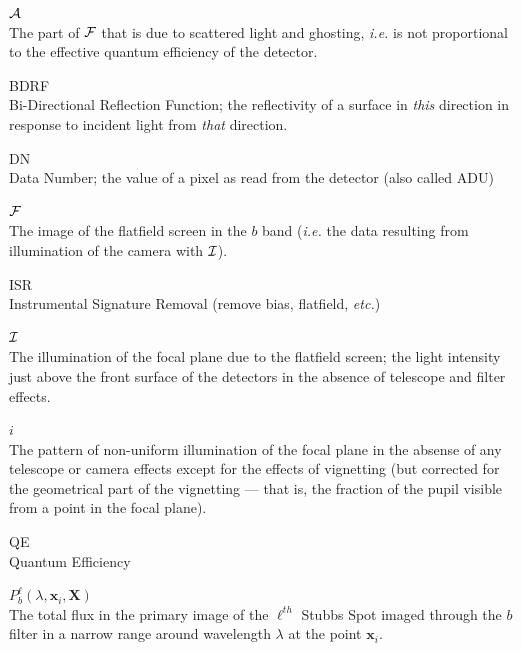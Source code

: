 \documentclass[12pt]{article}
\newcommand{\etc}{\textit{etc.}\xspace}
\newcommand{\ie}{\textit{i.e.}\xspace}
\newcommand{\Xb}{{\boldsymbol X}}
\newcommand{\xb}{{\boldsymbol x}}
\newcommand{\Flat}{{\cal F}}
\newcommand{\screen}{{\cal I}}
\newcommand{\additive}{{\cal A}}
\begin{document}
\begin{description}
  \item $\additive$\\
    The part of $\Flat$ that is due to scattered light and ghosting, \ie is not proportional
    to the effective quantum efficiency of the detector.      

  \item{BDRF}\\
    Bi-Directional Reflection Function; the reflectivity of a surface in \textit{this} direction
    in response to incident light from \textit{that} direction.

  \item{DN}\\
    Data Number; the value of a pixel as read from the detector (also called ADU)

  \item $\Flat$\\
    The image of the flatfield screen in the $b$ band (\ie the data resulting from illumination
    of the camera with $\screen$).

  \item{ISR}\\
    Instrumental Signature Removal (remove bias, flatfield, \etc)

  \item $\screen$\\
    The illumination of the focal plane due to the flatfield screen; the light intensity
    just above the front surface of the detectors in the absence of telescope and filter effects.

  \item $i$\\
    The pattern of non-uniform illumination of the focal plane in the absense of any telescope or camera
    effects except for the effects of vignetting (but corrected for the geometrical part of the
    vignetting --- that is, the fraction of the pupil visible from a point in the focal plane).

  \item{QE}\\
    Quantum Efficiency

  \item $P_b^\ell(\lambda, \xb_i, \Xb)$\\
    The total flux in the primary image of the $\ell^{th}$ Stubbs Spot imaged through the $b$ filter in a
    narrow range around wavelength $\lambda$ at the point $\xb_i$.
    

\end{description}
\end{document}
